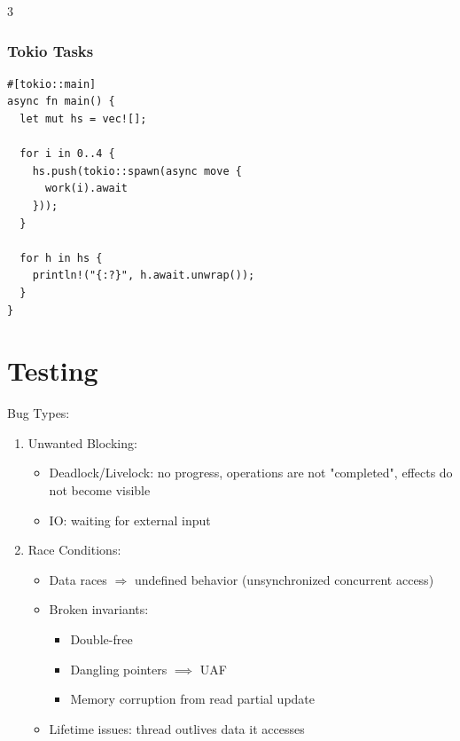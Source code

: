 \documentclass[12pt, a4paper]{article}
\begin{document}
\begin{multicols*}{3}
\subsubsection{Tokio Tasks}
\begin{lstlisting}[basicstyle=\ttfamily\scriptsize]
#[tokio::main]
async fn main() {
  let mut hs = vec![];

  for i in 0..4 {
    hs.push(tokio::spawn(async move {
      work(i).await
    }));
  }

  for h in hs {
    println!("{:?}", h.await.unwrap());
  }
}
\end{lstlisting}
\colbreak
\section{Testing}
\lstset{style=c}
Bug Types:
\begin{enumerate}[\roman*.]
\item Unwanted Blocking:
  \begin{itemize}[leftmargin=*]
    \item Deadlock/Livelock: no progress, operations are not "completed", effects do not become visible
    \item IO: waiting for external input
  \end{itemize}
\item Race Conditions:
  \begin{itemize}[leftmargin=*]\vspace{3pt}
    \item Data races $\Rightarrow$ undefined behavior (unsynchronized concurrent access)
    \item Broken invariants:
      \begin{itemize}[leftmargin=*]\vspace{5pt}
        \item Double-free 
        \item Dangling pointers $\implies$ UAF
        \item Memory corruption from read partial update
      \end{itemize}
    \item Lifetime issues: thread outlives data it accesses
  \end{itemize}
\end{enumerate}


\end{multicols*}
\end{document}
